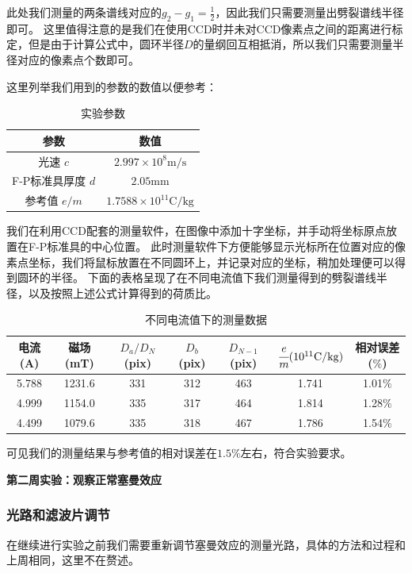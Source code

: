 \documentclass[12pt,a4paper,UTF8]{ctexart}
\begin{document}
此处我们测量的两条谱线对应的$g_{2}-g_{1}=\frac{1}{2}$，因此我们只需要测量出劈裂谱线半径即可。
这里值得注意的是我们在使用CCD时并未对CCD像素点之间的距离进行标定，但是由于计算公式中，圆环半径$D$的量纲回互相抵消，所以我们只需要测量半径对应的像素点个数即可。

这里列举我们用到的参数的数值以便参考：
\begin{table}[h!]
    \centering
    \begin{tabular}{cc}
        \hline
        参数 & 数值 \\
        \hline
        光速 $c$ & $2.997 \times 10^8 \mathrm{m/s}$ \\
        F-P标准具厚度 $d$ & $2.05 \mathrm{mm}$ \\
        参考值 $e/m$  & $1.7588 \times 10^{11} \mathrm{C/kg}$ \\
        \hline
    \end{tabular}
    \caption{实验参数}
    \label{tab:parameters}
\end{table}

我们在利用CCD配套的测量软件，在图像中添加十字坐标，并手动将坐标原点放置在F-P标准具的中心位置。
此时测量软件下方便能够显示光标所在位置对应的像素点坐标，我们将鼠标放置在不同圆环上，并记录对应的坐标，稍加处理便可以得到圆环的半径。
下面的表格呈现了在不同电流值下我们测量得到的劈裂谱线半径，以及按照上述公式计算得到的荷质比。

\begin{table}[h!]
    \centering
    \begin{tabular}{|c|c|c|c|c|c|c|}
        \hline
        电流(A) & 磁场(mT) & $D_a / D_N$(pix) & $D_b$(pix) & $D_{N-1}$(pix)  & $\cfrac{e}{m}(10^{11}\mathrm{C/kg})$ & 相对误差($\%$) \\
        \hline\hline
        5.788 & 1231.6 & 331 & 312 & 463 & 1.741 & 1.01$\%$ \\
        4.999 & 1154.0 & 335 & 317 & 464 & 1.814 & 1.28$\%$ \\
        4.499 & 1079.6 & 335 & 318 & 467 & 1.786 & 1.54$\%$ \\
        \hline
    \end{tabular}
    \caption{不同电流值下的测量数据}
    \label{tab:measurements}
\end{table}

可见我们的测量结果与参考值的相对误差在$1.5\%$左右，符合实验要求。

\textbf{第二周实验：观察正常塞曼效应}

\subsubsection*{光路和滤波片调节}
在继续进行实验之前我们需要重新调节塞曼效应的测量光路，具体的方法和过程和上周相同，这里不在赘述。
\end{document}
